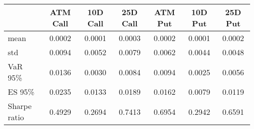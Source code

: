 \begin{tabular}{lSSSSSS}
\toprule
{} &  {ATM Call} &  {10D Call} &  {25D Call} &  {ATM Put} &  {10D Put} &  {25D Put} \\
\midrule
mean         &          0.0002 &          0.0001 &          0.0003 &         0.0002 &         0.0001 &         0.0002 \\
std          &          0.0094 &          0.0052 &          0.0079 &         0.0062 &         0.0044 &         0.0048 \\
VaR 95\%      &         0.0136 &          0.0030 &          0.0084 &         0.0094 &         0.0025 &         0.0056 \\
ES 95\%       &         0.0235 &          0.0133 &          0.0189 &         0.0162 &         0.0079 &         0.0119 \\
Sharpe ratio &          0.4929 &          0.2694 &          0.7413 &         0.6954 &         0.2942 &         0.6591 \\
\bottomrule
\end{tabular}
